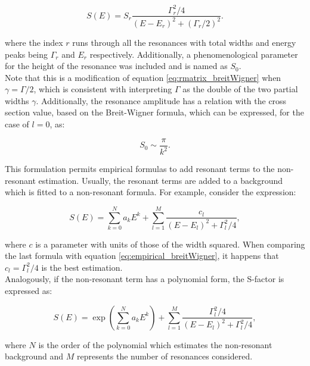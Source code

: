 \documentclass[openany]{book}
\begin{document}
\begin{equation} \label{eq:empirical_breitWigner}
	S(E) = S_r \frac{\Gamma^2_r/4}{(E-E_r)^2 + (\Gamma_r/2)^2}.
\end{equation}

where the index $r$ runs through all the resonances with total widths and energy peaks being $\Gamma_r$ and $E_r$ respectively. Additionally, a phenomenological parameter for the height of the resonance was included and is named as $S_0$. \\

 Note that this is a modification of equation \ref{eq:rmatrix_breitWigner} when $\gamma = \Gamma/2$, which is consistent with interpreting $\Gamma$ as the double of the two partial widths $\gamma$. Additionally, the resonance amplitude has a relation with the cross section value, based on the Breit-Wigner formula, which can be expressed, for the case of $l = 0$, as: 
 
 \begin{equation} \label{eq:empirical_breitWigner_S0}
 	S_0 \sim  \frac{\pi}{k^2}. 
 \end{equation}

This formulation permits empirical formulas to add resonant terms to the non-resonant estimation. Usually, the resonant terms are added to a background which is fitted to a non-resonant formula. For example, consider the expression: 

\begin{equation}  \label{eq:empirical_hybridPolynomial}
	S(E) =  \sum _{k = 0}^{N} {a_kE^k} + \sum_{l = 1}^{M} {\frac{c_l}{(E - E_l)^2 + \Gamma_l^2/4}},
\end{equation}

where $c$ is a parameter with units of those of the width squared. When comparing the last formula with equation \ref{eq:empirical_breitWigner}, it happens that $c_l = \Gamma^2_l/4$ is the best estimation. \\

Analogously, if the non-resonant term has a polynomial form, the S-factor is expressed as:

\begin{equation}  \label{eq:empirical_hybridExponential}
	S(E) =  \exp { \left( \sum _{k = 0}^{N} {a_kE^k} \right) } + \sum_{l = 1}^{M} {\frac{\Gamma_l^2/4}{(E - E_l)^2 + \Gamma_l^2/4}},
\end{equation}

where $N$ is the order of the polynomial which estimates the non-resonant background and $M$ represents the number of resonances considered.  \\
\end{document}
